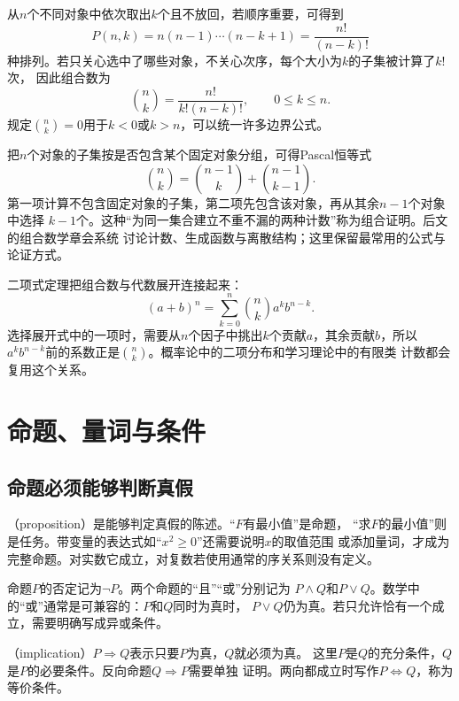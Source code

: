 从$n$个不同对象中依次取出$k$个且不放回，若顺序重要，可得到
\[
  P(n,k)=n(n-1)\cdots(n-k+1)=\frac{n!}{(n-k)!}
\]
种排列。若只关心选中了哪些对象，不关心次序，每个大小为$k$的子集被计算了$k!$次，
因此组合数为
\begin{equation}
  \binom{n}{k}=\frac{n!}{k!(n-k)!},
  \qquad 0\leq k\leq n.
  \label{eq:prelim-binomial-coefficient}
\end{equation}
规定$\binom{n}{k}=0$用于$k<0$或$k>n$，可以统一许多边界公式。

把$n$个对象的子集按是否包含某个固定对象分组，可得Pascal恒等式
\[
  \binom{n}{k}
  =
  \binom{n-1}{k}
  +
  \binom{n-1}{k-1}.
\]
第一项计算不包含固定对象的子集，第二项先包含该对象，再从其余$n-1$个对象中选择
$k-1$个。这种“为同一集合建立不重不漏的两种计数”称为组合证明。后文的组合数学章会系统
讨论计数、生成函数与离散结构；这里保留最常用的公式与论证方式。

二项式定理把组合数与代数展开连接起来：
\begin{equation}
  (a+b)^n
  =
  \sum_{k=0}^{n}\binom{n}{k}a^k b^{n-k}.
  \label{eq:prelim-binomial-theorem}
\end{equation}
选择展开式中的一项时，需要从$n$个因子中挑出$k$个贡献$a$，其余贡献$b$，所以
$a^k b^{n-k}$前的系数正是$\binom{n}{k}$。概率论中的二项分布和学习理论中的有限类
计数都会复用这个关系。

\section{命题、量词与条件}
\label{sec:prelim-propositions-quantifiers}

\subsection{命题必须能够判断真假}

（proposition）是能够判定真假的陈述。“$F$有最小值”是命题，
“求$F$的最小值”则是任务。带变量的表达式如“$x^2\geq0$”还需要说明$x$的取值范围
或添加量词，才成为完整命题。对实数它成立，对复数若使用通常的序关系则没有定义。

命题$P$的否定记为$\neg P$。两个命题的“且”“或”分别记为
$P\land Q$和$P\lor Q$。数学中的“或”通常是可兼容的：$P$和$Q$同时为真时，
$P\lor Q$仍为真。若只允许恰有一个成立，需要明确写成异或条件。

（implication）$P\Rightarrow Q$表示只要$P$为真，$Q$就必须为真。
这里$P$是$Q$的充分条件，$Q$是$P$的必要条件。反向命题$Q\Rightarrow P$需要单独
证明。两向都成立时写作$P\Leftrightarrow Q$，称为等价条件。

